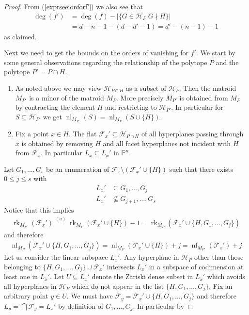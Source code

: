 \documentclass[a4paper,10pt]{amsart}
\theoremstyle{definition}
\theoremstyle{plain}
\newcommand{\rk}{\operatorname{rk}}
\newcommand{\nl}{\operatorname{nl}}
\newcommand{\cF}{{\mathcal F}}
\newcommand{\cH}{{\mathcal H}}
\newcommand{\pp}{\mathbb{P}}
\begin{document}
\begin{proof}
    From (\ref{exprseeionforf'}) we also see that \begin{align*}
        \deg(f')&=\deg(f)-|\{G\in \cH_P| G\nmid H\}|\\&= d-n-1-(d-d'-1)=d'-(n-1)-1
    \end{align*}
as claimed.

    Next we need to get the bounds on the orders of vanishing for $f'$. We start by some general observations regarding the relationship of the polytope $P$ and the polytope $P'=P\cap H$. \begin{enumerate}[label=(\alph*)]
        \item As noted above we may view $\cH_{P\cap H}$ as a subset of $\cH_P$. Then the matroid $M_{P'}$ is a minor of the matroid $M_P$. More precisely $M_{P'}$ is obtained from $M_P$ by contracting the element $H$ and restricting to $\cH_{P'}$. In particular for $S\subseteq \cH_{P'}$ we get $\nl_{M_{P'}}(S)=\nl_{M_P}(S\cup\{H\})$.
        \item Fix a point $x \in H$. The flat $\cF_x'\subseteq \cH_{P\cap H}$ of all hyperplanes passing through $x$ is obtained by removing $H$ and all facet hyperplanes not incident with $H$ from $\cF_x$. In particular $L_x \subseteq L_x'$ in $\pp^n$.
    \end{enumerate}
        Let $G_1,\ldots,G_s$ be an enumeration of $\cF_x\setminus (\cF_x'\cup \{H\})$ such that there exists $0\leq j\leq s$ with \begin{align*}
            L_x'&\subseteq G_1,\ldots, G_j \\
             L_x'&\nsubseteq G_{j+1},\ldots, G_s 
        \end{align*}
        Notice that this implies \begin{align*}
            \rk_{M_{P'}}(\cF_x')\overset{(a)}{=}\rk_{M_P}(\cF_x'\cup\{H\})-1= \rk_{M_P}(\cF_x'\cup\{H,G_1,\ldots,G_j\})
        \end{align*}
        and therefore \begin{align}
        \label{eq:nullity_ineq}
            \nl_{M_P}(\cF_x'\cup\{H,G_1,\ldots,G_j\})= \nl_{M_P}(\cF_x'\cup\{H\})+j= \nl_{M_{P'}}(\cF_x')+j
        \end{align}
        Let us consider the linear subspace $L_x'$. Any hyperplane in $\cH_P$ other than those belonging to $\{H,G_1,\ldots,G_j\}\cup \cF_x'$ intersects $L_x'$ in a subspace of codimension at least one in $L_x'$. Let $U\subseteq L_x'$ denote the Zariski dense subset in $L_x'$ which avoids all hyperplanes in $\cH_P$ which do not appear in the list $\{H,G_1,\ldots,G_j\}$. Fix an arbitrary point $y\in U$. We must have $\cF_y=\cF_x'\cup\{H,G_1,\ldots,G_j\}$ and therefore $L_y=\bigcap \cF_y=L_x'$ by definition of $G_1,\ldots,G_j$. In particular by 

\end{proof}
\end{document}
